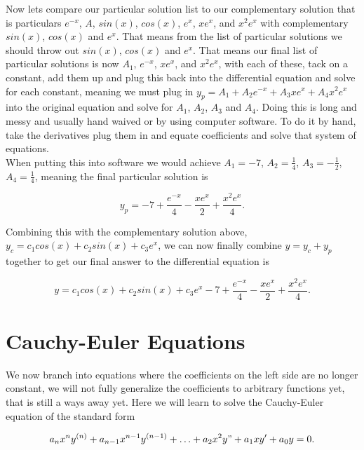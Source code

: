 \documentclass[12pt]{article}
\begin{document}
Now lets compare our particular solution list to our complementary solution that is particulars $e^{-x}$, $A$, $sin(x)$, $cos(x)$, $e^{x}$, $xe^{x}$, and $x^2e^{x}$ with complementary $sin(x)$, $cos(x)$ and $e^{x}$. That means from the list of particular solutions we should throw out $sin(x)$, $cos(x)$ and $e^{x}$. That means our final list of particular solutions is now $A_1$, $e^{-x}$, $xe^{x}$, and $x^2e^{x}$, with each of these, tack on a constant, add them up and plug this back into the differential equation and solve for each constant, meaning we must plug in $y_p=A_1+A_2e^{-x}+A_3xe^{x}+A_4x^2e^{x}$ into the original equation and solve for $A_1$, $A_2$, $A_3$ and $A_4$. Doing this is long and messy and usually hand waived or by using computer software. To do it by hand, take the derivatives plug them in and equate coefficients and solve that system of equations. \\

When putting this into software we would achieve $A_1=-7$, $A_2=\frac{1}{4}$, $A_3=-\frac{1}{2}$, $A_4=\frac{1}{4}$, meaning the final particular solution is 

\begin{equation*}
    y_p=-7+\frac{e^{-x}}{4}-\frac{xe^{x}}{2}+\frac{x^2e^{x}}{4}.
\end{equation*}

Combining this with the complementary solution above, $y_c=c_1cos(x)+c_2sin(x)+c_3e^x$, we can now finally combine $y=y_c+y_p$ together to get our final answer to the differential equation is

\begin{equation*}
    y=c_1cos(x)+c_2sin(x)+c_3e^x-7+\frac{e^{-x}}{4}-\frac{xe^{x}}{2}+\frac{x^2e^{x}}{4}.
\end{equation*}

\section{Cauchy-Euler Equations}

We now branch into equations where the coefficients on the left side are no longer constant, we will not fully generalize the coefficients to arbitrary functions yet, that is still a ways away yet. Here we will learn to solve the Cauchy-Euler equation of the standard form

\begin{equation*}
    a_nx^ny^{(n)}+a_{n-1}x^{n-1}y^{(n-1)}+\ldots+a_2x^2y"+a_1xy'+a_0y=0.
\end{equation*}
\end{document}
